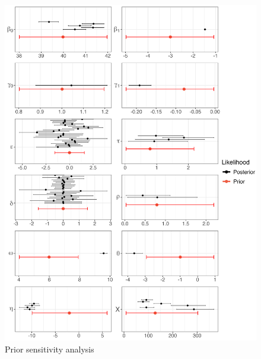 \documentclass{article}
\begin{document}
\begin{figure}[tbhp] 
\centering
\includegraphics[width=16.5cm]{Plots/Diagnostic_Fig_2.jpg}  
\caption{Prior sensitivity analysis}
\label{fig:prior_sens}
\end{figure}
\end{document}
